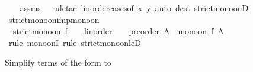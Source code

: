 \begin{isabellebody}
%
\isadelimproof
\ \ %
\endisadelimproof
%
\isatagproof
{}\isamarkupfalse%
\ assms\ \isamarkupfalse%
\ {\isacharparenleft}{\kern0pt}rule{\isacharunderscore}{\kern0pt}tac\ linorder{\isacharunderscore}{\kern0pt}cases{\isacharbrackleft}{\kern0pt}of\ x\ y{\isacharbrackright}{\kern0pt}{\isacharparenright}{\kern0pt}\ {\isacharparenleft}{\kern0pt}auto\ dest{\isacharcolon}{\kern0pt}\ strict{\isacharunderscore}{\kern0pt}mono{\isacharunderscore}{\kern0pt}onD{\isacharparenright}{\kern0pt}%
\endisatagproof
{\isafoldproof}%
%
\isadelimproof
\isanewline
%
\endisadelimproof
\isanewline
{}\isamarkupfalse%
\ strict{\isacharunderscore}{\kern0pt}mono{\isacharunderscore}{\kern0pt}on{\isacharunderscore}{\kern0pt}imp{\isacharunderscore}{\kern0pt}mono{\isacharunderscore}{\kern0pt}on{\isacharcolon}{\kern0pt}\isanewline
\ \ {\isachardoublequoteopen}strict{\isacharunderscore}{\kern0pt}mono{\isacharunderscore}{\kern0pt}on\ {\isacharparenleft}{\kern0pt}f\ {\isacharcolon}{\kern0pt}{\isacharcolon}{\kern0pt}\ {\isacharparenleft}{\kern0pt}{\isacharunderscore}{\kern0pt}\ {\isacharcolon}{\kern0pt}{\isacharcolon}{\kern0pt}\ linorder{\isacharparenright}{\kern0pt}\ {\isasymRightarrow}\ {\isacharunderscore}{\kern0pt}\ {\isacharcolon}{\kern0pt}{\isacharcolon}{\kern0pt}\ preorder{\isacharparenright}{\kern0pt}\ A\ {\isasymLongrightarrow}\ mono{\isacharunderscore}{\kern0pt}on\ f\ A{\isachardoublequoteclose}\isanewline
%
\isadelimproof
\ \ %
\endisadelimproof
%
\isatagproof
{}\isamarkupfalse%
\ {\isacharparenleft}{\kern0pt}rule\ mono{\isacharunderscore}{\kern0pt}onI{\isacharcomma}{\kern0pt}\ rule\ strict{\isacharunderscore}{\kern0pt}mono{\isacharunderscore}{\kern0pt}on{\isacharunderscore}{\kern0pt}leD{\isacharparenright}{\kern0pt}%
\endisatagproof
{\isafoldproof}%
%
\isadelimproof
%
\endisadelimproof
%
\isadelimdocument
%
\endisadelimdocument
%
\isatagdocument
%
\isamarkuptrue%
%
\isamarkuptrue%
%
\endisatagdocument
{\isafolddocument}%
%
\isadelimdocument
%
\endisadelimdocument
%
\begin{isamarkuptext}%
Simplify terms of the form  to %

\end{isamarkuptext}
\end{isabellebody}
